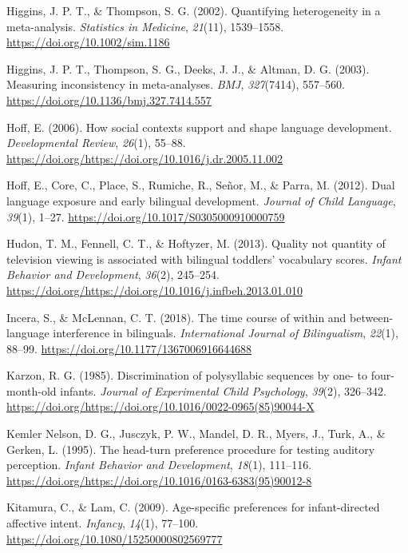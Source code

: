 \documentclass[
  english,
  ,man,floatsintext]{apa6}
\begin{document}
\leavevmode\hypertarget{ref-higgins_2002}{}%
Higgins, J. P. T., \& Thompson, S. G. (2002). Quantifying heterogeneity in a meta-analysis. \emph{Statistics in Medicine}, \emph{21}(11), 1539--1558. \url{https://doi.org/10.1002/sim.1186}

\leavevmode\hypertarget{ref-higgins_2003}{}%
Higgins, J. P. T., Thompson, S. G., Deeks, J. J., \& Altman, D. G. (2003). Measuring inconsistency in meta-analyses. \emph{BMJ}, \emph{327}(7414), 557--560. \url{https://doi.org/10.1136/bmj.327.7414.557}

\leavevmode\hypertarget{ref-hoff_2006}{}%
Hoff, E. (2006). How social contexts support and shape language development. \emph{Developmental Review}, \emph{26}(1), 55--88. \url{https://doi.org/https://doi.org/10.1016/j.dr.2005.11.002}

\leavevmode\hypertarget{ref-hoff_2012}{}%
Hoff, E., Core, C., Place, S., Rumiche, R., Señor, M., \& Parra, M. (2012). Dual language exposure and early bilingual development. \emph{Journal of Child Language}, \emph{39}(1), 1--27. \url{https://doi.org/10.1017/S0305000910000759}

\leavevmode\hypertarget{ref-hudon_2013}{}%
Hudon, T. M., Fennell, C. T., \& Hoftyzer, M. (2013). Quality not quantity of television viewing is associated with bilingual toddlers' vocabulary scores. \emph{Infant Behavior and Development}, \emph{36}(2), 245--254. \url{https://doi.org/https://doi.org/10.1016/j.infbeh.2013.01.010}

\leavevmode\hypertarget{ref-incera_2018}{}%
Incera, S., \& McLennan, C. T. (2018). The time course of within and between-language interference in bilinguals. \emph{International Journal of Bilingualism}, \emph{22}(1), 88--99. \url{https://doi.org/10.1177/1367006916644688}

\leavevmode\hypertarget{ref-karzon_1985}{}%
Karzon, R. G. (1985). Discrimination of polysyllabic sequences by one- to four-month-old infants. \emph{Journal of Experimental Child Psychology}, \emph{39}(2), 326--342. \url{https://doi.org/https://doi.org/10.1016/0022-0965(85)90044-X}

\leavevmode\hypertarget{ref-kemler_nelson_1995}{}%
Kemler Nelson, D. G., Jusczyk, P. W., Mandel, D. R., Myers, J., Turk, A., \& Gerken, L. (1995). The head-turn preference procedure for testing auditory perception. \emph{Infant Behavior and Development}, \emph{18}(1), 111--116. \url{https://doi.org/https://doi.org/10.1016/0163-6383(95)90012-8}

\leavevmode\hypertarget{ref-kitamura_2009}{}%
Kitamura, C., \& Lam, C. (2009). Age-specific preferences for infant-directed affective intent. \emph{Infancy}, \emph{14}(1), 77--100. \url{https://doi.org/10.1080/15250000802569777}
\end{document}
